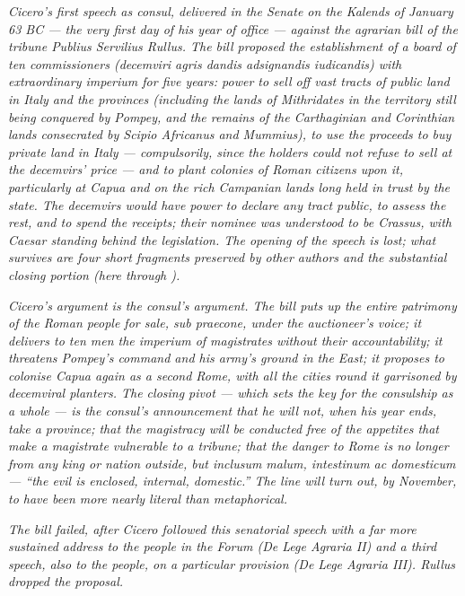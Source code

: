 
\textit{Cicero's first speech as consul, delivered in the Senate
on the Kalends of January 63 BC --- the very first day of his
year of office --- against the agrarian bill of the tribune
Publius Servilius Rullus. The bill proposed the establishment
of a board of ten commissioners (\textit{decemviri agris
dandis adsignandis iudicandis}) with extraordinary imperium
for five years: power to sell off vast tracts of public land
in Italy and the provinces (including the lands of Mithridates
in the territory still being conquered by Pompey, and the
remains of the Carthaginian and Corinthian lands consecrated
by Scipio Africanus and Mummius), to use the proceeds to buy
private land in Italy --- compulsorily, since the holders
could not refuse to sell at the decemvirs' price --- and to
plant colonies of Roman citizens upon it, particularly at
Capua and on the rich Campanian lands long held in trust by
the state. The decemvirs would have power to declare any tract
public, to assess the rest, and to spend the receipts; their
nominee was understood to be Crassus, with Caesar standing
behind the legislation. The opening of the speech is lost; what
survives are four short fragments preserved by other authors
and the substantial closing portion (here 
through ).}

\textit{Cicero's argument is the consul's argument. The bill
puts up the entire patrimony of the Roman people for sale,
\textit{sub praecone}, under the auctioneer's voice; it
delivers to ten men the imperium of magistrates without their
accountability; it threatens Pompey's command and his army's
ground in the East; it proposes to colonise Capua again as a
second Rome, with all the cities round it garrisoned by
decemviral planters. The closing pivot --- which sets the key
for the consulship as a whole --- is the consul's announcement
that he will not, when his year ends, take a province; that
the magistracy will be conducted free of the appetites that
make a magistrate vulnerable to a tribune; that the danger to
Rome is no longer from any king or nation outside, but
\textit{inclusum malum, intestinum ac domesticum} --- ``the
evil is enclosed, internal, domestic.'' The line will turn
out, by November, to have been more nearly literal than
metaphorical.}

\textit{The bill failed, after Cicero followed this senatorial
speech with a far more sustained address to the people in the
Forum (\textit{De Lege Agraria II}) and a third speech, also
to the people, on a particular provision (\textit{De Lege
Agraria III}). Rullus dropped the proposal.}
